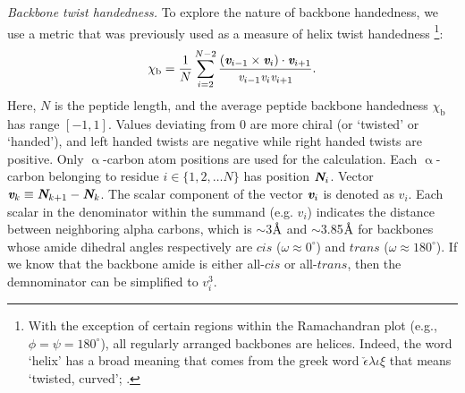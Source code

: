 \documentclass[fleqn,10pt]{wlpeerj} %
\newcommand{\ang}{$\textrm\AA$\xspace}
\begin{document}
{\it Backbone twist handedness.} To explore the nature of backbone handedness, we use a metric that was previously used as a measure of helix twist handedness \citep{Kwiecinska2005}\footnote{With the exception of certain regions within the Ramachandran plot (e.g., $\phi=\psi=180^\circ$), all regularly arranged backbones are helices. Indeed, the word `helix' has a broad meaning that comes from the greek word $\check\epsilon\lambda\iota\xi$ that means `twisted, curved'; \cite{Liddell1894}.}:
\begin{equation} \label{chi1}
\chi_\textrm{b} = \frac{1}{N}\sum_{i = 2}^{N-2} \frac{(\textit{\textbf{v}}_{i-1} \times \textit{\textbf{v}}_{i})\cdot \textit{\textbf{v}}_{i+1}}{\textit{v}_{i-1} \textit{v}_{i} \textit{v}_{i+1}}.
\end{equation}
Here, $N$ is the peptide length, and the average peptide backbone handedness $\chi_\textrm{b}$ has range $[-1,1]$. Values deviating from 0 are more chiral (or `twisted' or `handed'), and left handed twists are negative while right handed twists are positive. Only $\upalpha$-carbon atom positions are used for the calculation. Each $\upalpha$-carbon belonging to residue $i \in \{ 1,2,\ldots N \}$ has position $\textit{\textbf{N}}_i$. %
Vector $\textit{\textbf{v}}_{k} \equiv \textit{\textbf{N}}_{k+1} - \textit{\textbf{N}}_{k}$. 
The scalar component of the vector $\textit{\textbf{v}}_i$ is denoted as $\textit{v}_i$. Each scalar in the denominator within the summand (e.g. $\textit{v}_i$) indicates the distance between neighboring alpha carbons, which is $\sim$3\ang and $\sim$3.85\ang for backbones whose amide dihedral angles respectively are $cis$ ($\omega\approx0^\circ$) and $trans$ ($\omega\approx180^\circ$). If we know that the backbone amide is either all-$cis$ or all-$trans$, then the demnominator can be simplified to $\textit{v}_i^3$.
\end{document}
